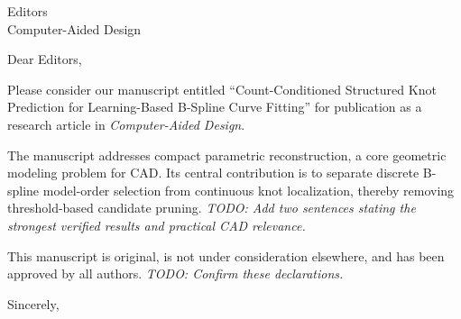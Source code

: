 \documentclass[11pt]{letter}
\begin{document}
\begin{letter}{Editors\\Computer-Aided Design}
\opening{Dear Editors,}

Please consider our manuscript entitled ``Count-Conditioned Structured Knot
Prediction for Learning-Based B-Spline Curve Fitting'' for publication as a
research article in \emph{Computer-Aided Design}.

The manuscript addresses compact parametric reconstruction, a core geometric
modeling problem for CAD. Its central contribution is to separate discrete
B-spline model-order selection from continuous knot localization, thereby
removing threshold-based candidate pruning. \textit{TODO: Add two sentences
stating the strongest verified results and practical CAD relevance.}

This manuscript is original, is not under consideration elsewhere, and has been
approved by all authors. \textit{TODO: Confirm these declarations.}

\closing{Sincerely,}
\end{letter}
\end{document}
